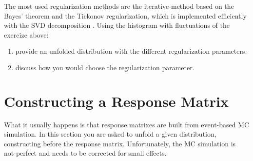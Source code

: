 \documentclass[a4paper,11pt]{article}
\begin{document}
The most used regularization methods are the iterative-method based on the Bayes' theorem \cite{dAgostini} and the Tickonov regularization, which is implemented efficiently with the \gls{SVD} decomposition \cite{SVD}.
Using the histogram with fluctuations of the exercize above:
\begin{enumerate}
	\item provide an unfolded distribution with the different regularization parameters.
	\item discuss how you would choose the regularization parameter.
\end{enumerate}

\section{Constructing a Response Matrix}

What it usually happens is that response matrixes are built from event-based \gls{MC} simulation.
In this section you are asked to unfold a given distribution, constructing before the response matrix.
Unfortunately, the \gls{MC} simulation is not-perfect and needs to be corrected for small effects.

\FloatBarrier
\nocite{*}
%


\cleardoublepage
\end{document}

